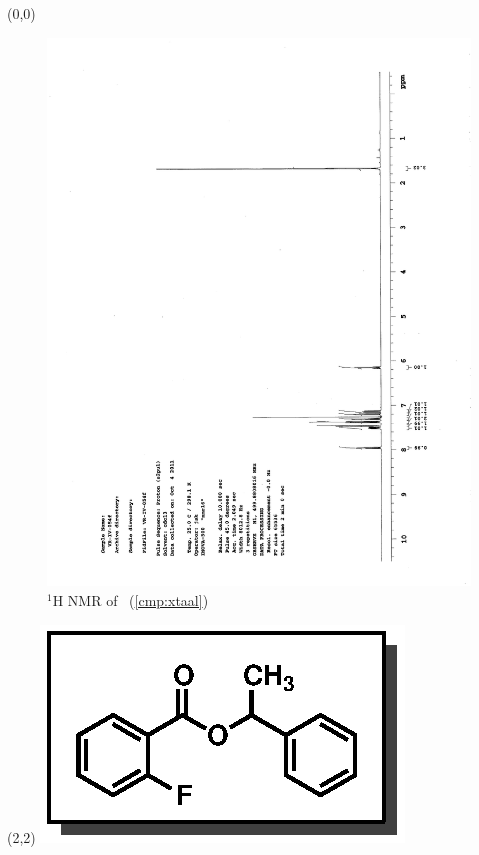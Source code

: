 \begin{textblock}{20}(0,0)
\begin{figure}[htb]
\caption{$^1$H NMR of \CMPxtaal\ (\ref{cmp:xtaal})}
\includegraphics[scale=0.75, trim = 0mm 0mm 0mm 5mm,
clip]{chp_asymmetric/images/nmr/xtaalH}
\vspace{-100pt}
\end{figure}
\end{textblock}
\begin{textblock}{1}(2,2)
\includegraphics[scale=0.8, angle=90]{chp_asymmetric/images/xtaal}
\end{textblock}
